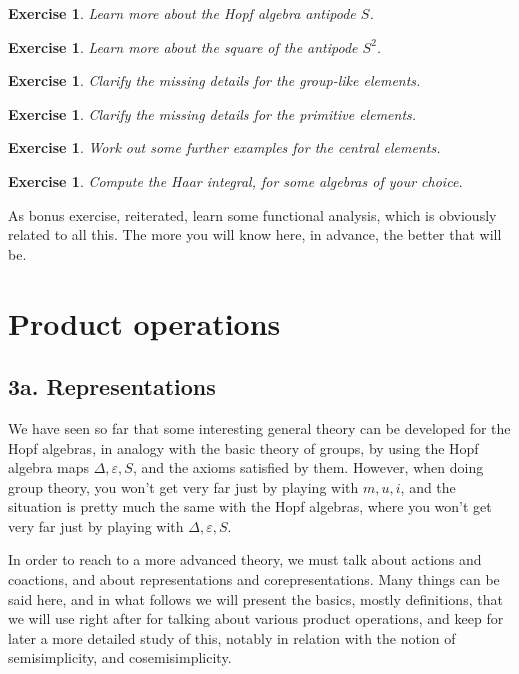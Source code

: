 \documentclass[12pt]{amsbook}
\newtheorem{exercise}[theorem]{Exercise}
\begin{document}
\begin{exercise}
Learn more about the Hopf algebra antipode $S$.
\end{exercise}

\begin{exercise}
Learn more about the square of the antipode $S^2$.
\end{exercise}

\begin{exercise}
Clarify the missing details for the group-like elements.
\end{exercise}

\begin{exercise}
Clarify the missing details for the primitive elements.
\end{exercise}

\begin{exercise}
Work out some further examples for the central elements.
\end{exercise}

\begin{exercise}
Compute the Haar integral, for some algebras of your choice.
\end{exercise}

As bonus exercise, reiterated, learn some functional analysis, which is obviously related to all this. The more you will know here, in advance, the better that will be.

\chapter{Product operations}

\section*{3a. Representations}

We have seen so far that some interesting general theory can be developed for the Hopf algebras, in analogy with the basic theory of groups, by using the Hopf algebra maps $\Delta,\varepsilon,S$, and the axioms satisfied by them. However, when doing group theory, you won't get very far just by playing with $m,u,i$, and the situation is pretty much the same with the Hopf algebras, where you won't get very far just by playing with $\Delta,\varepsilon,S$. 

\bigskip

In order to reach to a more advanced theory, we must talk about actions and coactions, and about representations and corepresentations. Many things can be said here, and in what follows we will present the basics, mostly definitions, that we will use right after for talking about various product operations, and keep for later a more detailed study of this, notably in relation with the notion of semisimplicity, and cosemisimplicity.
\end{document}
